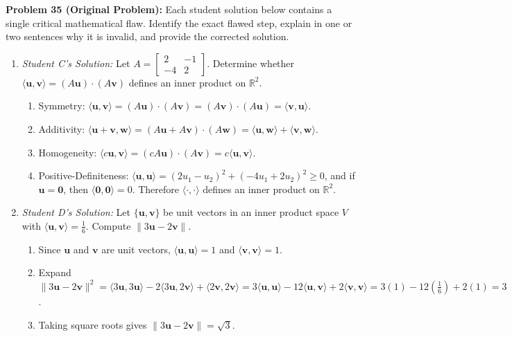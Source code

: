\documentclass[11pt, letterpaper]{article}
\theoremstyle{definition}
\theoremstyle{remark}
\begin{document}
\textbf{Problem 35 (Original Problem):} Each student solution below contains a single critical mathematical flaw. Identify the exact flawed step, explain in one or two sentences why it is invalid, and provide the corrected solution.
\begin{enumerate}[label=(\alph*)]
    \item \emph{Student C's Solution:} Let $A = \begin{bmatrix} 2 & -1 \\ -4 & 2 \end{bmatrix}$. Determine whether $\langle \mathbf{u}, \mathbf{v} \rangle = (A\mathbf{u}) \cdot (A\mathbf{v})$ defines an inner product on $\mathbb{R}^2$.
    \begin{enumerate}[label=Step \arabic*:]
        \item Symmetry: $\langle \mathbf{u}, \mathbf{v} \rangle = (A\mathbf{u})\cdot(A\mathbf{v}) = (A\mathbf{v})\cdot(A\mathbf{u}) = \langle \mathbf{v}, \mathbf{u} \rangle$.
        \item Additivity: $\langle \mathbf{u}+\mathbf{v}, \mathbf{w} \rangle = (A\mathbf{u}+A\mathbf{v})\cdot(A\mathbf{w}) = \langle \mathbf{u}, \mathbf{w} \rangle + \langle \mathbf{v}, \mathbf{w} \rangle$.
        \item Homogeneity: $\langle c\mathbf{u}, \mathbf{v} \rangle = (cA\mathbf{u})\cdot(A\mathbf{v}) = c\langle \mathbf{u}, \mathbf{v} \rangle$.
        \item Positive-Definiteness: $\langle \mathbf{u}, \mathbf{u} \rangle = (2u_1 - u_2)^2 + (-4u_1 + 2u_2)^2 \ge 0$, and if $\mathbf{u} = \mathbf{0}$, then $\langle \mathbf{0}, \mathbf{0} \rangle = 0$. Therefore $\langle \cdot, \cdot \rangle$ defines an inner product on $\mathbb{R}^2$.
    \end{enumerate}
    \item \emph{Student D's Solution:} Let $\{\mathbf{u}, \mathbf{v}\}$ be unit vectors in an inner product space $V$ with $\langle \mathbf{u}, \mathbf{v} \rangle = \frac{1}{6}$. Compute $\|3\mathbf{u} - 2\mathbf{v}\|$.
    \begin{enumerate}[label=Step \arabic*:]
        \item Since $\mathbf{u}$ and $\mathbf{v}$ are unit vectors, $\langle \mathbf{u}, \mathbf{u} \rangle = 1$ and $\langle \mathbf{v}, \mathbf{v} \rangle = 1$.
        \item Expand $\|3\mathbf{u} - 2\mathbf{v}\|^2 = \langle 3\mathbf{u}, 3\mathbf{u} \rangle - 2\langle 3\mathbf{u}, 2\mathbf{v} \rangle + \langle 2\mathbf{v}, 2\mathbf{v} \rangle = 3\langle \mathbf{u}, \mathbf{u} \rangle - 12\langle \mathbf{u}, \mathbf{v} \rangle + 2\langle \mathbf{v}, \mathbf{v} \rangle = 3(1) - 12\left(\frac{1}{6}\right) + 2(1) = 3$.
        \item Taking square roots gives $\|3\mathbf{u} - 2\mathbf{v}\| = \sqrt{3}$.
    \end{enumerate}
\end{enumerate}
\end{document}
